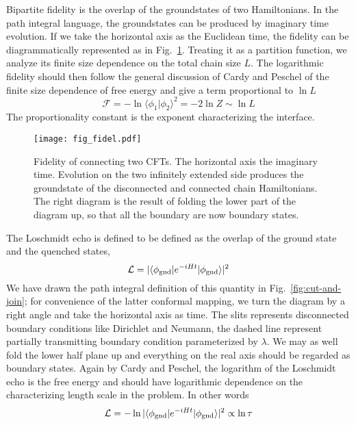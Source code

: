 
Bipartite fidelity is the overlap of the groundstates of two Hamiltonians. In the path integral language, the groundstates can be produced by imaginary time evolution. If we take the horizontal axis as the Euclidean time, the fidelity can be diagrammatically represented as in Fig.~\ref{fig:fidel}. Treating it as a partition function, we analyze its finite size dependence on the total chain size $L$. The logarithmic fidelity should then follow the general discussion of Cardy and Peschel\cite{cardy_finite-size_1988} of the finite size dependence of free energy and give a term proportional to $\ln L$
\begin{equation}
\mathcal{F} = - \ln \langle \phi_1 |\phi_2 \rangle^2 = - 2 \ln Z  \sim  \ln L 
\end{equation}
The proportionality constant is the exponent characterizing the interface. 

\begin{figure}[h]
\centering
\texttt{[image: fig\_fidel.pdf]}
\caption{Fidelity of connecting two CFTs. The horizontal axis the imaginary time. Evolution on the two infinitely extended side produces the groundstate of the disconnected and connected chain Hamiltonians. The right diagram is the result of folding the lower part of the diagram up, so that all the boundary are now boundary states.}
\label{fig:fidel}
\end{figure}


The Loschmidt echo is defined to be defined as the overlap of the ground state and the quenched states, 
\begin{equation}
\mathcal{L} = |\langle \phi_{\rm gnd}  | e^{-i Ht } | \phi_{\rm gnd} \rangle|^2
\end{equation}
We have drawn the path integral definition of this quantity in Fig.~\ref{fig:cut-and-join}; for convenience of the latter conformal mapping, we turn the diagram by a right angle and take the horizontal axis as time. The slits represents disconnected boundary conditions like Dirichlet and Neumann, the dashed line represent partially transmitting boundary condition parameterized by $\lambda$. We may as well fold the lower half plane up and everything on the real axis should be regarded as boundary states. Again by Cardy and Peschel\cite{cardy_finite-size_1988}, the logarithm of the Loschmidt echo is the free energy and should have logarithmic dependence on the characterizing length scale in the problem. In other words
\begin{equation}
\mathcal{L} = - \ln |\langle \phi_{\rm gnd}  | e^{-i Ht } | \phi_{\rm gnd} \rangle|^2 \propto \ln \tau 
\end{equation}



